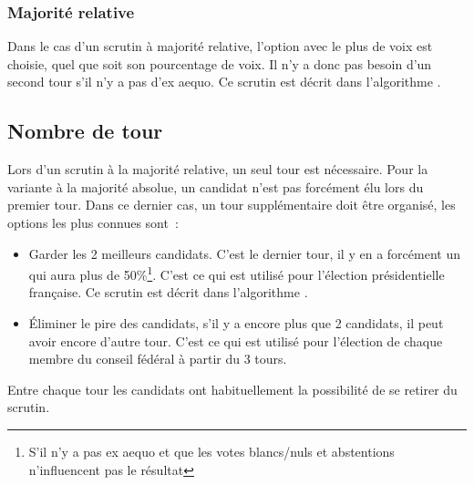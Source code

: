 \documentclass[../report]{subfiles}
\begin{document}
  \subsubsection{Majorité relative}
  Dans le cas d'un scrutin à majorité relative, l'option avec le plus de voix est choisie, 
  quel que soit son pourcentage de voix. Il n'y a donc pas besoin d'un second tour s'il n'y 
  a pas d'ex aequo. Ce scrutin est décrit dans l'algorithme .

  \begin{algorithm}
    \caption{Scrutin majoritaire uninominal à 1 tour}%
    \label{scrutin:maj-uni-1t}
    \begin{algorithmic}[1]
      \ENDFOR{}
    \end{algorithmic}
  \end{algorithm}


  \subsection{Nombre de tour}

  Lors d'un scrutin à la majorité relative, un seul tour est nécessaire.
  Pour la variante à la majorité absolue, un candidat n'est pas forcément élu lors du
  premier tour. Dans ce dernier cas, un tour supplémentaire doit être organisé, les options
  les plus connues sont~: 
  \begin{itemize}
    \item Garder les 2 meilleurs candidats. C'est le dernier tour, il y en a forcément un 
      qui aura plus de 50\%\footnote{S'il n'y a pas ex aequo et que les votes blancs/nuls 
      et abstentions n'influencent pas le résultat}. C'est ce qui est utilisé pour l'élection
      présidentielle française. Ce scrutin est décrit dans l'algorithme .
    \item Éliminer le pire des candidats, s'il y a encore plus que 2 candidats, il peut avoir
      encore d'autre tour. C'est ce qui est utilisé pour l'élection de chaque membre du
      conseil fédéral à partir du 3 tours.
  \end{itemize}

  Entre chaque tour les candidats ont habituellement la possibilité de se retirer du scrutin.
  
\end{document}

